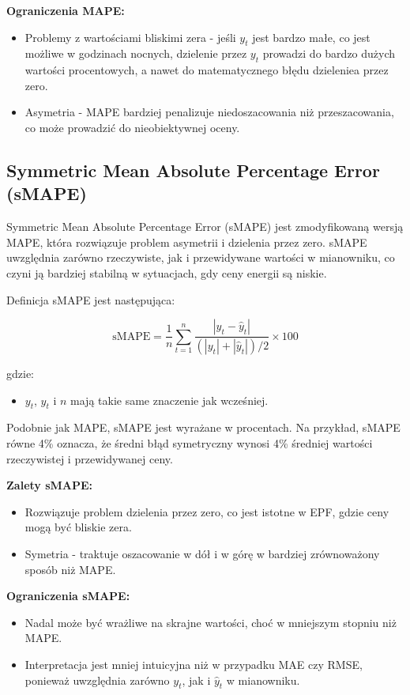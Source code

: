 \textbf{Ograniczenia MAPE:}
\begin{itemize}
    \item Problemy z wartościami bliskimi zera - jeśli \( y_t \) jest bardzo małe, co jest możliwe w godzinach nocnych, dzielenie przez \( y_t \) prowadzi do bardzo dużych wartości procentowych, a nawet do matematycznego błędu dzieleniea przez zero.
    \item Asymetria - MAPE bardziej penalizuje niedoszacowania niż przeszacowania, co może prowadzić do nieobiektywnej oceny.
\end{itemize}

\subsection{Symmetric Mean Absolute Percentage Error (sMAPE)}
\label{subsec:smape}

Symmetric Mean Absolute Percentage Error (sMAPE) jest zmodyfikowaną wersją MAPE, która rozwiązuje problem asymetrii i dzielenia przez zero. sMAPE uwzględnia zarówno rzeczywiste, jak i przewidywane wartości w mianowniku, co czyni ją bardziej stabilną w sytuacjach, gdy ceny energii są niskie.

Definicja sMAPE jest następująca:

\[
\text{sMAPE} = \frac{1}{n} \sum_{t=1}^{n} \frac{\left| y_t - \hat{y}_t \right|}{\left( \left| y_t \right| + \left| \hat{y}_t \right| \right) / 2} \times 100
\]

gdzie:
\begin{itemize}
    \item \( y_t \), \( \hat{y}_t \) i \( n \) mają takie same znaczenie jak wcześniej.
\end{itemize}

Podobnie jak MAPE, sMAPE jest wyrażane w procentach. Na przykład, sMAPE równe 4\% oznacza, że średni błąd symetryczny wynosi 4\% średniej wartości rzeczywistej i przewidywanej ceny.

\textbf{Zalety sMAPE:}
\begin{itemize}
    \item Rozwiązuje problem dzielenia przez zero, co jest istotne w EPF, gdzie ceny mogą być bliskie zera.
    \item Symetria - traktuje oszacowanie w dół i w górę w bardziej zrównoważony sposób niż MAPE.
\end{itemize}

\textbf{Ograniczenia sMAPE:}
\begin{itemize}
    \item Nadal może być wrażliwe na skrajne wartości, choć w mniejszym stopniu niż MAPE.
    \item Interpretacja jest mniej intuicyjna niż w przypadku MAE czy RMSE, ponieważ uwzględnia zarówno \( y_t \), jak i \( \hat{y}_t \) w mianowniku.
\end{itemize}

